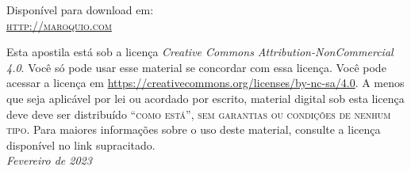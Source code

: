 \documentclass[
	11pt, %
	fleqn, %
	a4paper, %
        twoside,
]{ifescai}
\begin{document}
\noindent Disponível para download em:\\
\noindent \textsc{\href{https://www.maroquio.com/}{http://maroquio.com}}\\ %
\begin{spacing}{1.5}
\noindent Esta apostila está sob a licença \textit{Creative Commons Attribution-NonCommercial 4.0}. Você só pode usar esse material se concordar com essa licença. Você pode acessar a licença em \url{https://creativecommons.org/licenses/by-nc-sa/4.0}. A menos que seja aplicável por lei ou acordado por escrito, material digital sob esta licença deve deve ser distribuído \textsc{``como está'', sem garantias ou condições de nenhum tipo}. Para maiores informações sobre o uso deste material, consulte a licença disponível no link supracitado.\\

\noindent \textit{Fevereiro de 2023} %

\renewcommand*\contentsname{Sumário}

\renewcommand{\listfigurename}{Lista de Figuras}

\renewcommand{\listtablename}{Lista de Tabelas}

\renewcommand{\listoflistingscaption}{Lista de Exemplos de Código}

\renewcommand{\listingscaption}{Exemplo de Código}

\setcounter{tocdepth}{1}



\pagestyle{empty} %

\tableofcontents %

\listoffigures %


\listoflistings %


\end{spacing}
\end{document}
